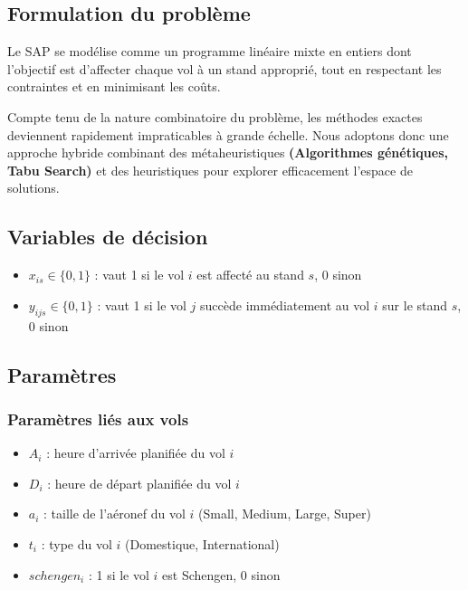 \subsection{Formulation du problème}

Le \ac{SAP} se modélise comme un programme
linéaire mixte en entiers dont l’objectif est d’affecter chaque vol à
un stand approprié, tout en respectant les contraintes et en minimisant les coûts.

Compte tenu de la nature combinatoire du problème, les méthodes exactes
deviennent rapidement impraticables à grande échelle. Nous adoptons donc
une approche hybride combinant des métaheuristiques \textbf{(Algorithmes
	génétiques, Tabu Search)} et des heuristiques pour explorer efficacement
l’espace de solutions.
\subsection*{Variables de décision}
\begin{itemize}
	\item $x_{is}\in\{0,1\}$ : vaut 1 si le vol $i$ est affecté au stand $s$, 0 sinon
	\item $y_{ijs}\in\{0,1\}$ : vaut 1 si le vol $j$ succède immédiatement au vol $i$ sur le stand $s$, 0 sinon
\end{itemize}

\subsection{Paramètres}

\subsubsection*{Paramètres liés aux vols}
\begin{itemize}
	\item $A_i$ : heure d’arrivée planifiée du vol $i$
	\item $D_i$ : heure de départ planifiée du vol $i$
	\item $a_i$ : taille de l’aéronef du vol $i$ (Small, Medium, Large, Super)
	\item $t_i$ : type du vol $i$ (Domestique, International)
	\item $schengen_i$ : 1 si le vol $i$ est Schengen, 0 sinon
\end{itemize}
\vspace{-0.8em}
